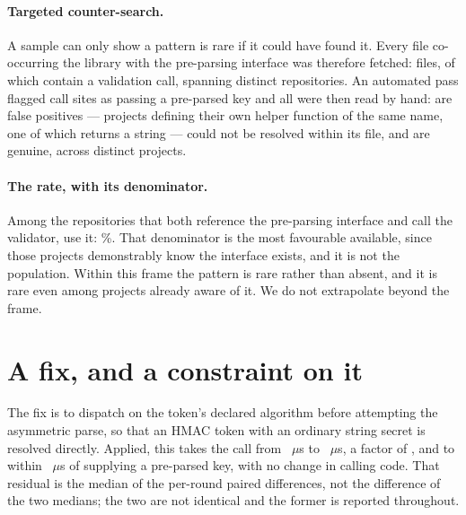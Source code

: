 \documentclass[pdflatex,sn-basic,twocolumn]{sn-jnl}%
\begin{document}
\paragraph{Targeted counter-search.} A sample can only show a pattern is rare if
it could have found it. Every file co-occurring the library with the pre-parsing
interface was therefore fetched: \CounterFilesFetched{} files, of which
\CounterWithVerify{} contain a validation call, spanning
\CounterReposWithVerify{} distinct repositories. An automated pass flagged
\AdjudicatedTotal{} call sites as passing a pre-parsed key and all were then read
by hand: \AdjudicatedFalsePositive{} are false positives --- projects defining
their own helper function of the same name, one of which returns a string ---
\AdjudicatedUnresolved{} could not be resolved within its file, and
\AdjudicatedGenuine{} are genuine, across \AdjudicatedGenuineProjects{} distinct
projects.

\paragraph{The rate, with its denominator.} Among the \CounterReposWithVerify{}
repositories that both reference the pre-parsing interface and call the
validator, \AdjudicatedGenuineProjects{} use it: \AdjudicatedGenuinePct\%. That
denominator is the most favourable available, since those projects demonstrably
know the interface exists, and it is not the population. Within this frame the
pattern is rare rather than absent, and it is rare even among projects already
aware of it. We do not extrapolate beyond the frame.

\section{A fix, and a constraint on it}\label{sec:fix}

The fix is to dispatch on the token's declared algorithm before attempting the
asymmetric parse, so that an HMAC token with an ordinary string secret is
resolved directly. Applied, this takes the call from \HostJwtString~$\mu$s to
\HostJwtStringSafe~$\mu$s, a factor of \HostSafePatchRatio, and to within
\HostSafePatchResidual~$\mu$s of supplying a pre-parsed key, with no change in
calling code. That residual is the median of the per-round paired differences,
not the difference of the two medians; the two are not identical and the former
is reported throughout.
\end{document}

